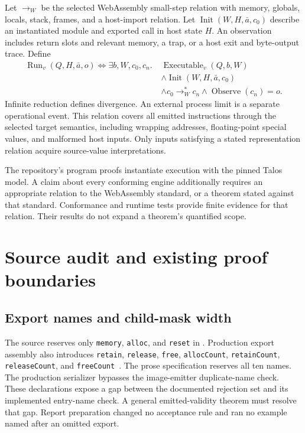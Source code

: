 \documentclass[11pt]{article}
\newcommand{\code}[1]{\texttt{#1}}
\newcommand{\longcode}[1]{\texttt{\seqsplit{#1}}}
\begin{document}
Let $\longrightarrow_W$ be the selected WebAssembly small-step relation with memory, globals, locals, stack, frames, and a host-import relation.  Let $\operatorname{Init}(W,H,\bar a,c_0)$ describe an instantiated module and exported call in host state $H$.  An observation includes return slots and relevant memory, a trap, or a host exit and byte-output trace.  Define
\begin{align*}
\operatorname{Run}_v(Q,H,\bar a,o)\iff\exists b,W,c_0,c_n.\;&
\operatorname{Executable}_v(Q,b,W)\\
&\land\operatorname{Init}(W,H,\bar a,c_0)\\
&\land c_0\longrightarrow_W^*c_n
\land\operatorname{Observe}(c_n)=o.
\end{align*}
Infinite reduction defines divergence.  An external process limit is a separate operational event.  This relation covers all emitted instructions through the selected target semantics, including wrapping addresses, floating-point special values, and malformed host inputs.  Only inputs satisfying a stated representation relation acquire source-value interpretations.

The repository's program proofs instantiate execution with the pinned Talos model.  A claim about every conforming engine additionally requires an appropriate relation to the WebAssembly standard, or a theorem stated against that standard.  Conformance and runtime tests provide finite evidence for that relation.  Their results do not expand a theorem's quantified scope.

\section{Source audit and existing proof boundaries}
\label{sec:audit}

\subsection{Export names and child-mask width}

The source reserves only \code{memory}, \code{alloc}, and \code{reset} in \longcode{Extract.Core.reservedExportNames}.  Production export assembly also introduces \code{retain}, \code{release}, \code{free}, \code{allocCount}, \code{retainCount}, \code{releaseCount}, and \code{freeCount}~\cite{extract,binary}.  The prose specification reserves all ten names.  The production serializer bypasses the image-emitter duplicate-name check.  These declarations expose a gap between the documented rejection set and its implemented entry-name check.  A general emitted-validity theorem must resolve that gap.  Report preparation changed no acceptance rule and ran no example named after an omitted export.
\end{document}
